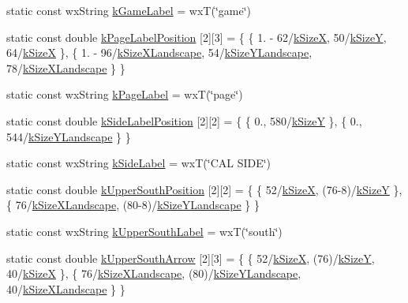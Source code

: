 \begin{DoxyCompactItemize}
\item 
static const wx\-String \hyperlink{a00222_a32e98b2590b7813d7ae3f82201bc17ff}{k\-Game\-Label} = wx\-T(\char`\"{}game\char`\"{})
\item 
static const double \hyperlink{a00222_a19f1949059e2222c3bc8453e70c35e42}{k\-Page\-Label\-Position} \mbox{[}2\mbox{]}\mbox{[}3\mbox{]} = \{ \{ 1. -\/ 62/\hyperlink{a00222_af38ec7276eab5e69e2b8b9b74c7e410d}{k\-Size\-X}, 50/\hyperlink{a00222_a96b810fae104880234d8c31ca2b86416}{k\-Size\-Y}, 64/\hyperlink{a00222_af38ec7276eab5e69e2b8b9b74c7e410d}{k\-Size\-X} \}, \{ 1. -\/ 96/\hyperlink{a00222_a6a5b0e2bab47c3fb6da928006951ed06}{k\-Size\-X\-Landscape}, 54/\hyperlink{a00222_a2874803a217d546e2cc3fe8647bc8506}{k\-Size\-Y\-Landscape}, 78/\hyperlink{a00222_a6a5b0e2bab47c3fb6da928006951ed06}{k\-Size\-X\-Landscape} \} \}
\item 
static const wx\-String \hyperlink{a00222_a5a5b744a5a5b90e2ee6ef7dcfed7e85e}{k\-Page\-Label} = wx\-T(\char`\"{}page\char`\"{})
\item 
static const double \hyperlink{a00222_a707097e4fa24a5daca2bab3e91a6a76c}{k\-Side\-Label\-Position} \mbox{[}2\mbox{]}\mbox{[}2\mbox{]} = \{ \{ 0., 580/\hyperlink{a00222_a96b810fae104880234d8c31ca2b86416}{k\-Size\-Y} \}, \{ 0., 544/\hyperlink{a00222_a2874803a217d546e2cc3fe8647bc8506}{k\-Size\-Y\-Landscape} \} \}
\item 
static const wx\-String \hyperlink{a00222_af4fa611fca6edf57449089039299f8a7}{k\-Side\-Label} = wx\-T(\char`\"{}C\-A\-L S\-I\-D\-E\char`\"{})
\item 
static const double \hyperlink{a00222_aaf67580aa2e3a063aa22f2d1155ba03d}{k\-Upper\-South\-Position} \mbox{[}2\mbox{]}\mbox{[}2\mbox{]} = \{ \{ 52/\hyperlink{a00222_af38ec7276eab5e69e2b8b9b74c7e410d}{k\-Size\-X}, (76-\/8)/\hyperlink{a00222_a96b810fae104880234d8c31ca2b86416}{k\-Size\-Y} \}, \{ 76/\hyperlink{a00222_a6a5b0e2bab47c3fb6da928006951ed06}{k\-Size\-X\-Landscape}, (80-\/8)/\hyperlink{a00222_a2874803a217d546e2cc3fe8647bc8506}{k\-Size\-Y\-Landscape} \} \}
\item 
static const wx\-String \hyperlink{a00222_afea558671b142a7362d642a399cb689e}{k\-Upper\-South\-Label} = wx\-T(\char`\"{}south\char`\"{})
\item 
static const double \hyperlink{a00222_a7108ab754109d418b1e23443b9dd114d}{k\-Upper\-South\-Arrow} \mbox{[}2\mbox{]}\mbox{[}3\mbox{]} = \{ \{ 52/\hyperlink{a00222_af38ec7276eab5e69e2b8b9b74c7e410d}{k\-Size\-X}, (76)/\hyperlink{a00222_a96b810fae104880234d8c31ca2b86416}{k\-Size\-Y}, 40/\hyperlink{a00222_af38ec7276eab5e69e2b8b9b74c7e410d}{k\-Size\-X} \}, \{ 76/\hyperlink{a00222_a6a5b0e2bab47c3fb6da928006951ed06}{k\-Size\-X\-Landscape}, (80)/\hyperlink{a00222_a2874803a217d546e2cc3fe8647bc8506}{k\-Size\-Y\-Landscape}, 40/\hyperlink{a00222_a6a5b0e2bab47c3fb6da928006951ed06}{k\-Size\-X\-Landscape} \} \}

\end{DoxyCompactItemize}

